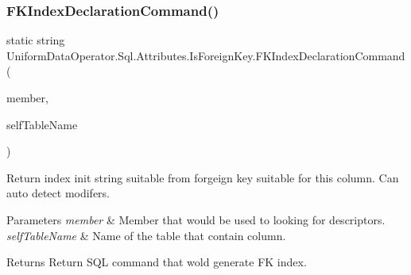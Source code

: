 \subsubsection{\texorpdfstring{F\+K\+Index\+Declaration\+Command()}{FKIndexDeclarationCommand()}\hspace{0.1cm}{\footnotesize\ttfamily [1/2]}}
{\footnotesize\ttfamily static string Uniform\+Data\+Operator.\+Sql.\+Attributes.\+Is\+Foreign\+Key.\+F\+K\+Index\+Declaration\+Command (\begin{DoxyParamCaption}\item[{Member\+Info}]{member,  }\item[{string}]{self\+Table\+Name }\end{DoxyParamCaption})\hspace{0.3cm}{\ttfamily [static]}}



Return index init string suitable from forgeign key suitable for this column. Can auto detect modifers. 


\begin{DoxyParams}{Parameters}
{\em member} & Member that would be used to looking for descriptors.\\
\hline
{\em self\+Table\+Name} & Name of the table that contain column.\\
\hline
\end{DoxyParams}
\begin{DoxyReturn}{Returns}
Return S\+QL command that wold generate FK index.
\end{DoxyReturn}
\mbox{\label{class_uniform_data_operator_1_1_sql_1_1_attributes_1_1_is_foreign_key_a6becd6dc4bd6df070252b152a57f0152}} 
